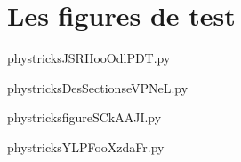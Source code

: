 \section{Les figures de test}



    \newcommand{\CaptionFigJSRHooOdlPDT}{This is an automatically generated default caption; do not change.}
    \begin{center}
        
    \end{center}
    phystricksJSRHooOdlPDT.py

    

    \clearpage
    


    \newcommand{\CaptionFigDesSectionseVPNeL}{This is an automatically generated default caption; do not change.}
    \begin{center}
        
    \end{center}
    phystricksDesSectionseVPNeL.py

    

    \clearpage
    


    \newcommand{\CaptionFigfigureSCkAAJI}{This is an automatically generated default caption; do not change.}
    \begin{center}
        
    \end{center}
    phystricksfigureSCkAAJI.py

    

    \clearpage
    


    \newcommand{\CaptionFigYLPFooXzdaFr}{This is an automatically generated default caption; do not change.}
    \begin{center}
        
    \end{center}
    phystricksYLPFooXzdaFr.py

    

    \clearpage
    


